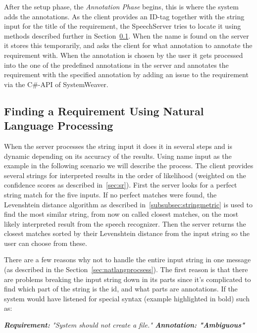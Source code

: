 After the setup phase, the \emph{Annotation Phase} begins, this is where the system adds the annotations. As the client provides an ID-tag together with the string input for the title of the requirement, the SpeechServer tries to locate it using methods described further in Section~\ref{sec:nlp}. When the name is found on the server it stores this temporarily, and asks the client for what annotation to annotate the requirement with. When the annotation is chosen by the user it gets processed into the one of the predefined annotations in the server and annotates the requirement with the specified annotation by adding an issue to the requirement via the C\#-API of SystemWeaver.

\subsection{Finding a Requirement Using Natural Language Processing}
\label{sec:nlp}
When the server processes the string input it does it in several steps and is dynamic depending on its accuracy of the results. Using name input as the example in the following scenario we will describe the process. The client provides several strings for interpreted results in the order of likelihood (weighted on the confidence scores as described in~\ref{sec:sr}). First the server looks for a perfect string match for the five inputs. If no perfect matches were found, the Levenshtein distance algorithm as described in~\ref{subsubsec:stringmetric} is used to find the most similar string, from now on called closest matches, on the most likely interpreted result from the speech recognizer. Then the server returns the closest matches sorted by their Levenshtein distance from the input string so the user can choose from these.

There are a few reasons why not to handle the entire input string in one message (as described in the Section~\ref{sec:natlangprocsess}). The first reason is that there are problems breaking the input string down in its parts since it's complicated to find which part of the string is the id, and what parts are annotations. If the system would have listened for special syntax (example highlighted in bold) such as:

\begin{framed}
\begin{flushleft}
\emph{\textbf{Requirement:} "System should not create a file." \textbf{Annotation: "Ambiguous"}}
\end{flushleft}
\end{framed}

